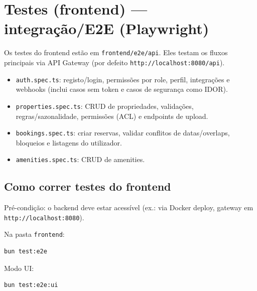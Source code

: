 \documentclass[11pt,a4paper]{article}
\begin{document}
\section{Testes (frontend) — integração/E2E (Playwright)}
Os testes do frontend estão em \texttt{frontend/e2e/api}. Eles testam os fluxos principais via API Gateway (por defeito \texttt{http://localhost:8080/api}).

\begin{itemize}[nosep]
  \item \texttt{auth.spec.ts}: registo/login, permissões por role, perfil, integrações e webhooks (inclui casos sem token e casos de segurança como IDOR).
  \item \texttt{properties.spec.ts}: CRUD de propriedades, validações, regras/sazonalidade, permissões (ACL) e endpoints de upload.
  \item \texttt{bookings.spec.ts}: criar reservas, validar conflitos de datas/overlaps, bloqueios e listagens do utilizador.
  \item \texttt{amenities.spec.ts}: CRUD de amenities.
\end{itemize}

\subsection{Como correr testes do frontend}
Pré-condição: o backend deve estar acessível (ex.: via Docker deploy, gateway em \texttt{http://localhost:8080}).

Na pasta \texttt{frontend}:
\begin{verbatim}
bun test:e2e
\end{verbatim}

Modo UI:
\begin{verbatim}
bun test:e2e:ui
\end{verbatim}
\end{document}
